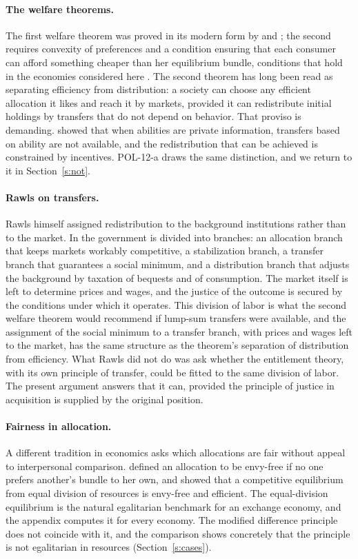 \documentclass{situationist-preprint}
\begin{document}
\paragraph{The welfare theorems.} The first welfare theorem was proved in its modern form by \citet{Arrow1951} and \citet{Debreu1959}; the second requires convexity of preferences and a condition ensuring that each consumer can afford something cheaper than her equilibrium bundle, conditions that hold in the economies considered here \citep[ch.~16]{MasColell1995}. The second theorem has long been read as separating efficiency from distribution: a society can choose any efficient allocation it likes and reach it by markets, provided it can redistribute initial holdings by transfers that do not depend on behavior. That proviso is demanding. \citet{Mirrlees1971} showed that when abilities are private information, transfers based on ability are not available, and the redistribution that can be achieved is constrained by incentives. POL-12-a draws the same distinction, and we return to it in Section~\ref{s:not}.

\paragraph{Rawls on transfers.} Rawls himself assigned redistribution to the background institutions rather than to the market. In \citet[\S 43]{Rawls1971} the government is divided into branches: an allocation branch that keeps markets workably competitive, a stabilization branch, a transfer branch that guarantees a social minimum, and a distribution branch that adjusts the background by taxation of bequests and of consumption. The market itself is left to determine prices and wages, and the justice of the outcome is secured by the conditions under which it operates. This division of labor is what the second welfare theorem would recommend if lump-sum transfers were available, and the assignment of the social minimum to a transfer branch, with prices and wages left to the market, has the same structure as the theorem's separation of distribution from efficiency. What Rawls did not do was ask whether the entitlement theory, with its own principle of transfer, could be fitted to the same division of labor. The present argument answers that it can, provided the principle of justice in acquisition is supplied by the original position.

\paragraph{Fairness in allocation.} A different tradition in economics asks which allocations are fair without appeal to interpersonal comparison. \citet{Foley1967} defined an allocation to be envy-free if no one prefers another's bundle to her own, and \citet{Varian1974} showed that a competitive equilibrium from equal division of resources is envy-free and efficient. The equal-division equilibrium is the natural egalitarian benchmark for an exchange economy, and the appendix computes it for every economy. The modified difference principle does not coincide with it, and the comparison shows concretely that the principle is not egalitarian in resources (Section~\ref{s:cases}).
\end{document}
